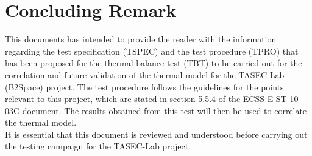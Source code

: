 \section{Concluding Remark} \label{sec:Conclusions}

This documents has intended to provide the reader with the information regarding the test specification (TSPEC) and the test procedure (TPRO) that has been proposed for the thermal balance test (TBT) to be carried out for the correlation and future validation of the thermal model for the TASEC-Lab (B2Space) project. The test procedure follows the guidelines for the points relevant to this project, which are stated in section 5.5.4 of the ECSS-E-ST-10-03C document. The results obtained from this test will then be used to correlate the thermal model. \\

It is essential that this document is reviewed and understood before carrying out the testing campaign for the TASEC-Lab project.
